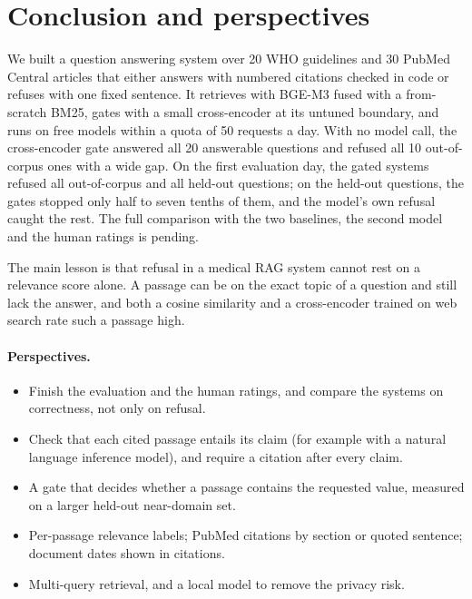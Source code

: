 \section{Conclusion and perspectives}
\label{sec:conclusion}

We built a question answering system over 20 WHO guidelines and 30 PubMed Central articles that either answers with numbered citations checked in code or refuses with one fixed sentence. It retrieves with BGE-M3 fused with a from-scratch BM25, gates with a small cross-encoder at its untuned boundary, and runs on free models within a quota of 50 requests a day. With no model call, the cross-encoder gate answered all 20 answerable questions and refused all 10 out-of-corpus ones with a wide gap. On the first evaluation day, the gated systems refused all out-of-corpus and all held-out questions; on the held-out questions, the gates stopped only half to seven tenths of them, and the model's own refusal caught the rest. The full comparison with the two baselines, the second model and the human ratings is pending. 

The main lesson is that refusal in a medical RAG system cannot rest on a relevance score alone. A passage can be on the exact topic of a question and still lack the answer, and both a cosine similarity and a cross-encoder trained on web search rate such a passage high.

\paragraph{Perspectives.}
\begin{itemize}
\item Finish the evaluation and the human ratings, and compare the systems on correctness, not only on refusal.
\item Check that each cited passage entails its claim (for example with a natural language inference model), and require a citation after every claim.
\item A gate that decides whether a passage contains the requested value, measured on a larger held-out near-domain set.
\item Per-passage relevance labels; PubMed citations by section or quoted sentence; document dates shown in citations.
\item Multi-query retrieval, and a local model to remove the privacy risk.
\end{itemize}
